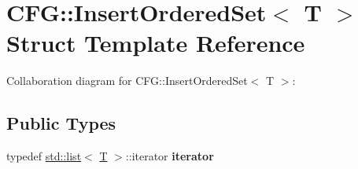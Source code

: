 \hypertarget{struct_c_f_g_1_1_insert_ordered_set}{}\section{C\+FG\+:\+:Insert\+Ordered\+Set$<$ T $>$ Struct Template Reference}
\label{struct_c_f_g_1_1_insert_ordered_set}


Collaboration diagram for C\+FG\+:\+:Insert\+Ordered\+Set$<$ T $>$\+:
\subsection*{Public Types}
\begin{DoxyCompactItemize}
\item 
\mbox{\label{struct_c_f_g_1_1_insert_ordered_set_a5bf93baac31285d54a2c1e83fc6d27c5}} 
typedef \mbox{\hyperlink{classstd_1_1list}{std\+::list}}$<$ \mbox{\hyperlink{struct_t}{T}} $>$\+::iterator {\bfseries iterator}
\end{DoxyCompactItemize}
